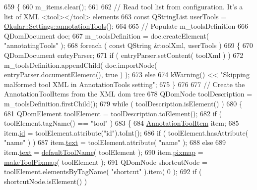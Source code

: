 \begin{DoxyCode}
659 \{
660     m\_items.clear();
661 
662     \textcolor{comment}{// Read tool list from configuration. It's a list of XML <tool></tool> elements}
663     \textcolor{keyword}{const} QStringList userTools = \hyperlink{classOkular_1_1Settings_a514e900aa0ed6dcc26aa1daa2521eaa5}{Okular::Settings::annotationTools}();
664 
665     \textcolor{comment}{// Populate m\_toolsDefinition}
666     QDomDocument doc;
667     m\_toolsDefinition = doc.createElement( \textcolor{stringliteral}{"annotatingTools"} );
668     \textcolor{keywordflow}{foreach} ( \textcolor{keyword}{const} QString &toolXml, userTools )
669     \{
670         QDomDocument entryParser;
671         \textcolor{keywordflow}{if} ( entryParser.setContent( toolXml ) )
672             m\_toolsDefinition.appendChild( doc.importNode( entryParser.documentElement(), true ) );
673         \textcolor{keywordflow}{else}
674             kWarning() << \textcolor{stringliteral}{"Skipping malformed tool XML in AnnotationTools setting"};
675     \}
676 
677     \textcolor{comment}{// Create the AnnotationToolItems from the XML dom tree}
678     QDomNode toolDescription = m\_toolsDefinition.firstChild();
679     \textcolor{keywordflow}{while} ( toolDescription.isElement() )
680     \{
681         QDomElement toolElement = toolDescription.toElement();
682         \textcolor{keywordflow}{if} ( toolElement.tagName() == \textcolor{stringliteral}{"tool"} )
683         \{
684             \hyperlink{structAnnotationToolItem}{AnnotationToolItem} item;
685             item.\hyperlink{structAnnotationToolItem_a738162ebc807fdfb9d0a7937c34bab01}{id} = toolElement.attribute(\textcolor{stringliteral}{"id"}).toInt();
686             \textcolor{keywordflow}{if} ( toolElement.hasAttribute( \textcolor{stringliteral}{"name"} ) )
687                 item.\hyperlink{structAnnotationToolItem_a5a24d93be5ae5fba2c921b205c29b017}{text} = toolElement.attribute( \textcolor{stringliteral}{"name"} );
688             \textcolor{keywordflow}{else}
689                 item.\hyperlink{structAnnotationToolItem_a5a24d93be5ae5fba2c921b205c29b017}{text} = \hyperlink{classPageViewAnnotator_a669d7d940ca6b93689724e43fba25c86}{defaultToolName}( toolElement );
690             item.\hyperlink{structAnnotationToolItem_a329b59ebf0a0064444d34874f41a70cb}{pixmap} = \hyperlink{classPageViewAnnotator_a54eb311605f2eefadaf78fd3b27eef7a}{makeToolPixmap}( toolElement );
691             QDomNode shortcutNode = toolElement.elementsByTagName( \textcolor{stringliteral}{"shortcut"} ).item( 0 );
692             \textcolor{keywordflow}{if} ( shortcutNode.isElement() )

\end{DoxyCode}
